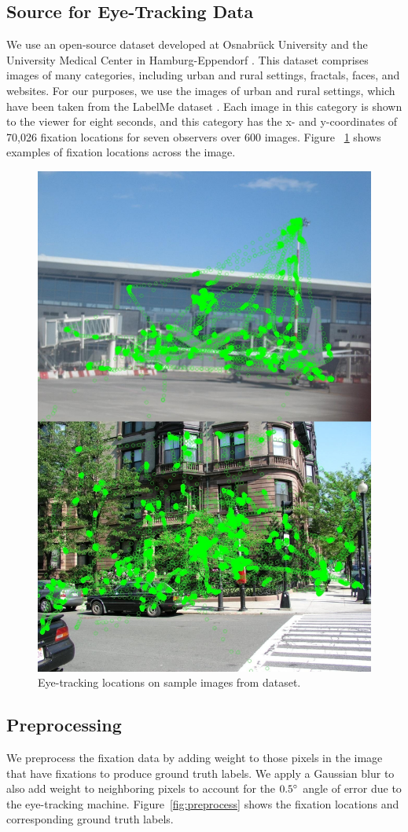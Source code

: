 \documentclass[10pt,twocolumn,letterpaper]{article}
\begin{document}
\subsection{Source for Eye-Tracking Data}
We use an open-source dataset developed at Osnabr\"uck University and the
University Medical Center in Hamburg-Eppendorf \cite{Wilming01, Wilming02}. This dataset comprises images
of many categories, including urban and rural settings, fractals, faces, and
websites. For our purposes, we use the images of urban and rural settings,
which have been taken from the LabelMe dataset \cite{labelme}. Each image in
this category is shown to the viewer for eight seconds, and this category has
the x- and y-coordinates of 70,026 fixation locations for seven observers over
600 images. Figure ~\ref{fig:dataset} shows examples of fixation locations
across the image. 
\begin{figure}
    \begin{center}
        \includegraphics[width=0.5\columnwidth]{figures/movements.jpg}
    \end{center}
    \caption{Eye-tracking locations on sample images from dataset.}
    \label{fig:dataset}
\end{figure}

\subsection{Preprocessing} We preprocess the fixation data by adding weight to
those pixels in the image that have fixations to produce ground truth labels.
We apply a Gaussian blur to also add weight to neighboring pixels to account
for the $0.5\degree$ angle of error due to the eye-tracking machine.
Figure~\ref{fig:preprocess} shows the fixation locations and corresponding
ground truth labels.
\end{document}
